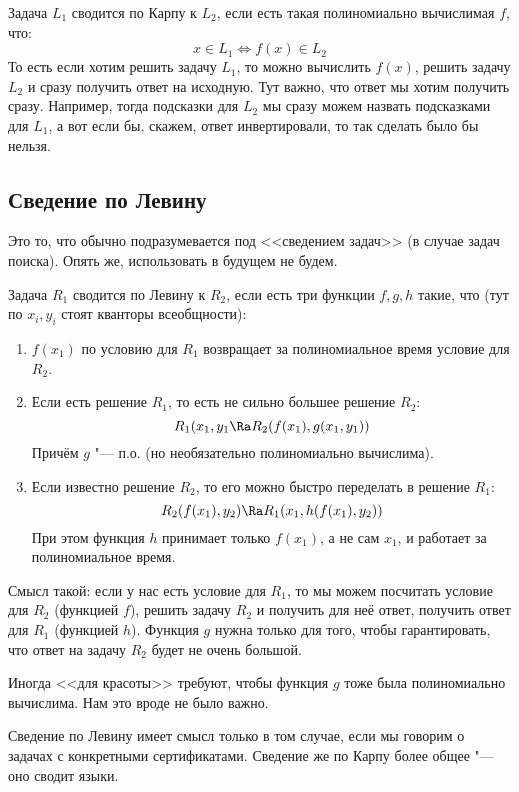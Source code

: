 	Задача $L_1$ сводится по Карпу к $L_2$, если есть такая полиномиально вычислимая $f$, что:
	\[ x \in L_1 \iff f(x) \in L_2 \]
	То есть если хотим решить задачу $L_1$, то можно вычислить $f(x)$, решить задачу $L_2$ и сразу получить ответ на исходную.
	Тут важно, что ответ мы хотим получить сразу.
	Например, тогда подсказки для $L_2$ мы сразу можем назвать подсказками для $L_1$, а вот если бы, скажем, ответ инвертировали, то так сделать было бы нельзя.

\subsection{Сведение по Левину}
	Это то, что обычно подразумевается под <<сведением задач>> (в случае задач поиска).
	Опять же, использовать в будущем не будем.

	Задача $R_1$ сводится по Левину к $R_2$, если есть три функции $f, g, h$ такие, что (тут по $x_i, y_i$ стоят кванторы всеобщности):
	\begin{enumerate}
		\item $f(x_1)$ по условию для $R_1$ возвращает за полиномиальное время условие для $R_2$.
		\item Если есть решение $R_1$, то есть не сильно большее решение $R_2$:
			\[ R_1(x_1, y_1 \Ra R_2(f(x_1), g(x_1, y_1)) \]
			Причём $g$ "--- п.о. (но необязательно полиномиально вычислима).
		\item Если известно решение $R_2$, то его можно быстро переделать в решение $R_1$: 
			\[ R_2(f(x_1), y_2) \Ra R_1(x_1, h(f(x_1), y_2)) \]
			При этом функция $h$ принимает только $f(x_1)$, а не сам $x_1$, и работает за полиномиальное время.
	\end{enumerate}
	\begin{Rem}
		Смысл такой: если у нас есть условие для $R_1$, то мы можем посчитать условие для $R_2$ (функцией $f$), решить задачу $R_2$ и получить для неё ответ,
		получить ответ для $R_1$ (функцией $h$).
		Функция $g$ нужна только для того, чтобы гарантировать, что ответ на задачу $R_2$ будет не очень большой.
	\end{Rem}
	\begin{Rem}
		Иногда <<для красоты>> требуют, чтобы функция $g$ тоже была полиномиально вычислима.
		Нам это вроде не было важно.
	\end{Rem}

	\begin{Rem}
		Сведение по Левину имеет смысл только в том случае, если мы говорим о задачах с конкретными сертификатами.
		Сведение же по Карпу более общее "--- оно сводит языки.
	\end{Rem}

